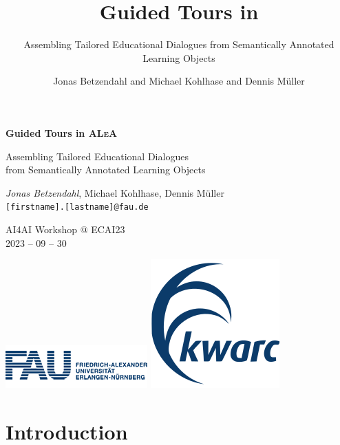 \documentclass[aspectratio=169, usenames, dvipsnames]{beamer}
\author{Jonas Betzendahl and Michael Kohlhase and Dennis Müller}
\title{Guided Tours in \ALeA}
\subtitle{Assembling Tailored Educational Dialogues from Semantically Annotated Learning Objects}
\def\ALeA{\textsc{ALeA}\xspace}
\begin{document}
\begin{frame}
\begin{center}
\huge \textbf{Guided Tours in \ALeA}\medskip

\large Assembling Tailored Educational Dialogues\\ from Semantically Annotated Learning Objects

\normalsize 
\bigskip\bigskip

\large \emph{Jonas Betzendahl}, Michael Kohlhase, Dennis Müller\\
\texttt{[firstname].[lastname]@fau.de}\bigskip

\small
AI4AI Workshop @ ECAI23\\
2023 -- 09 -- 30
\medskip

\includegraphics[scale=0.5]{images/fau_logo.png}
\qquad
\includegraphics[scale=0.25]{images/kwarclogo_faublau.png} 
\end{center}
\end{frame}

\section{Introduction}
\end{document}
